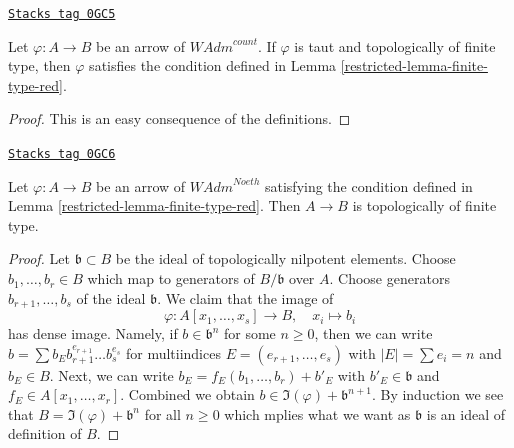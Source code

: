 \begin{lemma}
\label{restricted-lemma-finite-type-finite-type-red}
\href{https://stacks.math.columbia.edu/tag/0GC5}{\texttt{Stacks tag 0GC5}}

Let $\varphi : A \to B$ be an arrow of $\textit{WAdm}^{count}$.
If $\varphi$ is taut and topologically of finite type, then $\varphi$
satisfies the condition defined in Lemma \ref{restricted-lemma-finite-type-red}.
\end{lemma}

\begin{proof}
This is an easy consequence of the definitions.
\end{proof}

\begin{lemma}
\label{restricted-lemma-Noetherian-finite-type-red}
\href{https://stacks.math.columbia.edu/tag/0GC6}{\texttt{Stacks tag 0GC6}}

Let $\varphi : A \to B$ be an arrow of $\textit{WAdm}^{Noeth}$
satisfying the condition defined in Lemma \ref{restricted-lemma-finite-type-red}.
Then $A \to B$ is topologically of finite type.
\end{lemma}

\begin{proof}
Let $\mathfrak b \subset B$ be the
ideal of topologically nilpotent elements. Choose $b_1, \ldots, b_r \in B$
which map to generators of $B/\mathfrak b$ over $A$.
Choose generators $b_{r + 1}, \ldots, b_s$ of the ideal
$\mathfrak b$. We claim that the image of
$$
\varphi : A[x_1, \ldots, x_s] \longrightarrow B, \quad
x_i \longmapsto b_i
$$
has dense image. Namely, if $b \in \mathfrak b^n$ for some $n \geq 0$,
then we can write
$b = \sum b_E b_{r + 1}^{e_{r + 1}} \ldots b_s^{e_s}$ for multiindices
$E = (e_{r + 1}, \ldots, e_s)$ with $|E| = \sum e_i = n$ and $b_E \in B$.
Next, we can write $b_E = f_E(b_1, \ldots, b_r) + b'_E$
with $b'_E \in \mathfrak b$ and $f_E \in A[x_1, \ldots, x_r]$.
Combined we obtain $b \in \Im(\varphi) + \mathfrak b^{n + 1}$.
By induction we see that $B = \Im(\varphi) + \mathfrak b^n$ for all
$n \geq 0$ which mplies what we want as $\mathfrak b$ is an ideal
of definition of $B$.
\end{proof}

